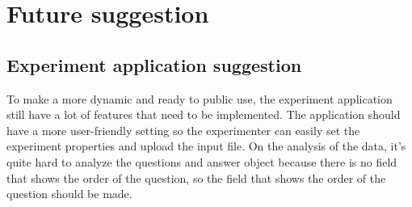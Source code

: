 

\section{Future suggestion}
\subsection{Experiment application suggestion}

To make a more dynamic and ready to public use, the experiment application still have a lot of features that need to be implemented.
The application should have a more user-friendly setting so the experimenter can easily set the experiment properties and upload the input file.
On the analysis of the data, it's quite hard to analyze the questions and answer object because there is no field that shows the order of the question, so
 the field that shows the order of the question should be made.

